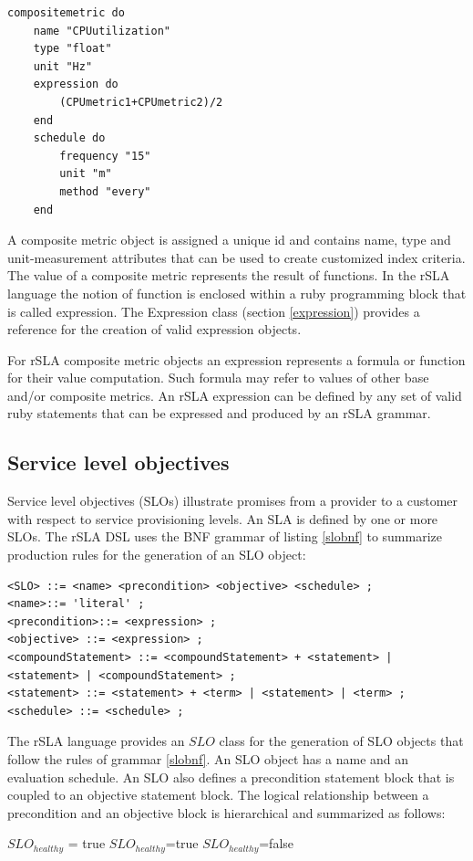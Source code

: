 \documentclass{llncs}
\begin{document}
\begin{lstlisting}[breaklines, firstnumber=auto, caption= rSLA composite metric definition, label =Composlst]
compositemetric do
    name "CPUutilization"
    type "float"
    unit "Hz"
    expression do
   		(CPUmetric1+CPUmetric2)/2
  	end
  	schedule do
    	frequency "15"
    	unit "m"
    	method "every"
  	end
\end{lstlisting}

A composite metric object is assigned a unique id and contains name, type and unit-measurement attributes that can be used to create customized index criteria. The value of a composite metric represents the result of functions. In the rSLA language the notion of function is enclosed within a ruby programming block that is called expression. The Expression class (section \ref{expression}) provides a reference for the creation of valid expression objects.  

For rSLA composite metric objects an expression represents a formula or function for their value computation. Such formula may refer to values of other base and/or composite metrics. An rSLA expression can be defined by any set of valid ruby statements that can be expressed and produced by an rSLA grammar.

\subsection{Service level objectives}\label{slos}

Service level objectives (SLOs) illustrate promises from a provider to a customer with respect to service provisioning levels\cite{wsla}. An SLA is defined by one or more SLOs. The rSLA DSL uses the BNF grammar of listing \ref{slobnf} to summarize production rules for the generation of an SLO object:
\begin{lstlisting}[breaklines, firstnumber=auto, caption= $<ServiceLevelObjective>$ BNF grammar, label=slobnf]
<SLO> ::= <name> <precondition> <objective> <schedule> ;
<name>::= 'literal' ;
<precondition>::= <expression> ;
<objective> ::= <expression> ;
<compoundStatement> ::= <compoundStatement> + <statement> | <statement> | <compoundStatement> ;
<statement> ::= <statement> + <term> | <statement> | <term> ;
<schedule> ::= <schedule> ;
\end{lstlisting}
 
The rSLA language provides an $SLO$ class for the generation of SLO objects that follow the rules of grammar \ref{slobnf}. An SLO object has a name and an evaluation schedule. 
An SLO also defines a precondition statement block that is coupled to an objective statement block. The logical relationship between a precondition and an objective block is hierarchical and summarized as follows:
\begin{algorithmic}
    \STATE $SLO_{healthy}$ = true
   \STATE $SLO_{healthy}$=true
\ELSE
\STATE $SLO_{healthy}$=false
  \ENDIF 
\end{algorithmic}
\end{document}
